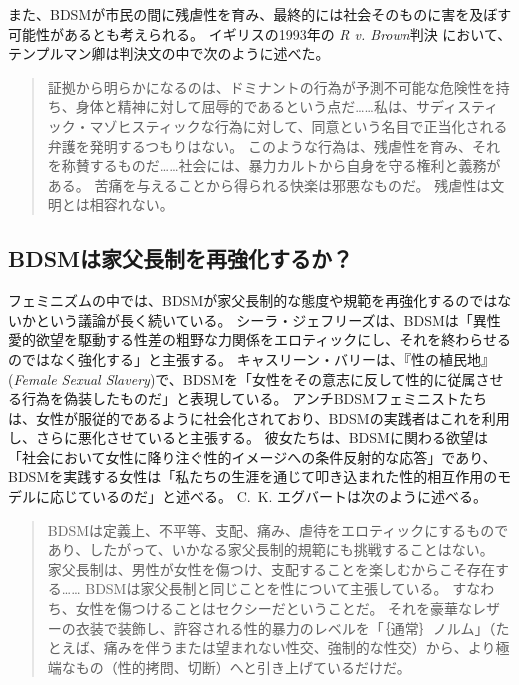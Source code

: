 \documentclass[paper=a4,book,openany]{jlreq}
\newcommand{\ig}[1]{}           %
\begin{document}
また、BDSMが市民の間に残虐性を育み、最終的には社会そのものに害を及ぼす可能性があるとも考えられる。
イギリスの1993年の \emph{R v. Brown}判決 において、テンプルマン卿は判決文の中で次のように述べた。

\begin{quote}
証拠から明らかになるのは、ドミナントの行為が予測不可能な危険性を持ち、身体と精神に対して屈辱的であるという点だ……私は、サディスティック・マゾヒスティックな行為に対して、同意という名目で正当化される弁護を発明するつもりはない。
このような行為は、残虐性を育み、それを称賛するものだ……社会には、暴力カルトから自身を守る権利と義務がある。
苦痛を与えることから得られる快楽は邪悪なものだ。
残虐性は文明とは相容れない。
\ig{(\emph{R v. Brown})}
\end{quote}

\subsection{BDSMは家父長制を再強化するか？}

フェミニズムの中では、BDSMが家父長制的な態度や規範を再強化するのではないかという議論が長く続いている。
シーラ・ジェフリーズは、BDSMは「異性愛的欲望を駆動する性差の粗野な力関係をエロティックにし、それを終わらせるのではなく強化する」と主張する\citep[p.86]{jeffreys96:_heter_desir_gender}。
キャスリーン・バリー\ig{Barry}は、『性の植民地』(\emph{Female Sexual Slavery})で、BDSMを「女性をその意志に反して性的に従属させる行為を偽装したものだ」と表現している\citep[p.209]{barry79:_femal_sexual_slaver}。
アンチBDSMフェミニストたちは、女性が服従的であるように社会化されており、BDSMの実践者はこれを利用し、さらに悪化させていると主張する。
彼女たちは、BDSMに関わる欲望は「社会において女性に降り注ぐ性的イメージへの条件反射的な応答」であり、BDSMを実践する女性は「私たちの生涯を通じて叩き込まれた性的相互作用のモデルに応じているのだ」と述べる\citep[p.139]{nichols82:_is_sadom_femin}。
C.~K. エグバートは次のように述べる。

\begin{quote}
 BDSMは定義上、不平等、支配、痛み、虐待をエロティックにするものであり、したがって、いかなる家父長制的規範にも挑戦することはない。
家父長制は、男性が女性を傷つけ、支配することを楽しむからこそ存在する…… BDSMは家父長制と同じことを性について主張している。
すなわち、女性を傷つけることはセクシーだということだ。
それを豪華なレザーの衣装で装飾し、許容される性的暴力のレベルを「｛通常｝{ノルム}」（たとえば、痛みを伴うまたは望まれない性交、強制的な性交）から、より極端なもの（性的拷問、切断）へと引き上げているだけだ。
\citep{egbert15:_bdsm_faq_frequen_asser_quibb}
\end{quote}
\end{document}

